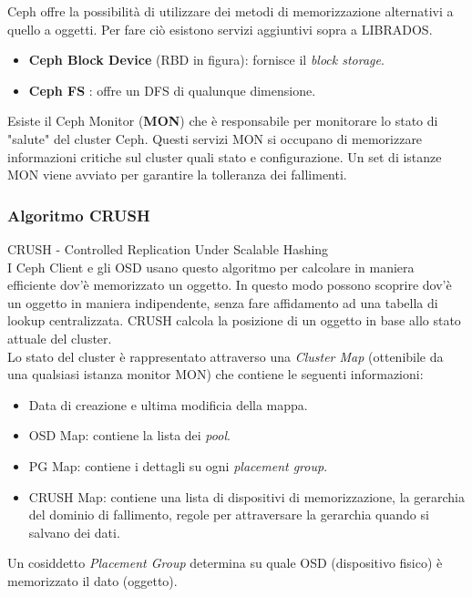 \documentclass{article}
\begin{document}
Ceph offre la possibilità di utilizzare dei metodi di memorizzazione alternativi a quello a oggetti. Per fare ciò esistono servizi aggiuntivi sopra a LIBRADOS.
\begin{itemize}
    \item \textbf{Ceph Block Device} (RBD in figura): fornisce il \textit{block storage}.
    \item \textbf{Ceph FS }: offre un DFS di qualunque dimensione.
\end{itemize}
Esiste il Ceph Monitor (\textbf{MON}) che è responsabile per monitorare lo stato di "salute" del cluster Ceph. Questi servizi MON si occupano di memorizzare informazioni critiche sul cluster quali stato e configurazione. Un set di istanze MON viene avviato per garantire la tolleranza dei fallimenti.

\subsubsection{Algoritmo CRUSH}
CRUSH - Controlled Replication Under Scalable Hashing\\
I Ceph Client e gli OSD usano questo algoritmo per calcolare in maniera efficiente dov'è memorizzato un oggetto. In questo modo possono scoprire dov'è un oggetto in maniera indipendente, senza fare affidamento ad una tabella di lookup centralizzata. CRUSH calcola la posizione di un oggetto in base allo stato attuale del cluster.\\
Lo stato del cluster è rappresentato attraverso una \textit{Cluster Map} (ottenibile da una qualsiasi istanza monitor MON) che contiene le seguenti informazioni:
\begin{itemize}
    \item Data di creazione e ultima modificia della mappa.
    \item OSD Map: contiene la lista dei \textit{pool}\footnotemark.
    \item PG Map: contiene i dettagli su ogni \textit{placement group}.
    \item CRUSH Map: contiene una lista di dispositivi di memorizzazione, la gerarchia del dominio di fallimento, regole per attraversare la gerarchia quando si salvano dei dati.
\end{itemize}
Un cosiddetto \textit{Placement Group} determina su quale OSD (dispositivo fisico)  è memorizzato il dato (oggetto).\\
\end{document}
